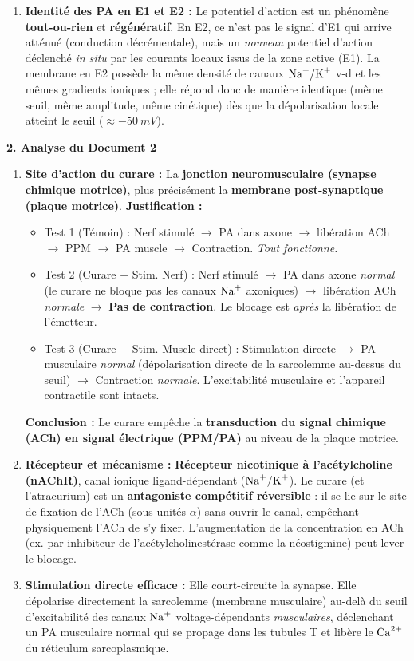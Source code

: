 \documentclass[11pt]{article}
\begin{document}
\begin{exoresolu}
\begin{enumerate}
    \item \textbf{Identité des PA en E1 et E2 :} Le potentiel d'action est un phénomène \textbf{tout-ou-rien} et \textbf{régénératif}. En E2, ce n'est pas le signal d'E1 qui arrive atténué (conduction décrémentale), mais un \emph{nouveau} potentiel d'action déclenché \emph{in situ} par les courants locaux issus de la zone active (E1). La membrane en E2 possède la même densité de canaux $\ce{Na+}/\ce{K+}$ v-d et les mêmes gradients ioniques ; elle répond donc de manière identique (même seuil, même amplitude, même cinétique) dès que la dépolarisation locale atteint le seuil ($\approx \SI{-50}{mV}$).
\end{enumerate}

\textbf{2. Analyse du Document 2}
\begin{enumerate}
    \item \textbf{Site d'action du curare :} La \textbf{jonction neuromusculaire (synapse chimique motrice)}, plus précisément la \textbf{membrane post-synaptique (plaque motrice)}.
    \textbf{Justification :}
    \begin{itemize}
        \item Test 1 (Témoin) : Nerf stimulé $\rightarrow$ PA dans axone $\rightarrow$ libération ACh $\rightarrow$ PPM $\rightarrow$ PA muscle $\rightarrow$ Contraction. \emph{Tout fonctionne.}
        \item Test 2 (Curare + Stim. Nerf) : Nerf stimulé $\rightarrow$ PA dans axone \emph{normal} (le curare ne bloque pas les canaux $\ce{Na+}$ axoniques) $\rightarrow$ libération ACh \emph{normale} $\rightarrow$ \textbf{Pas de contraction}. Le blocage est \emph{après} la libération de l'émetteur.
        \item Test 3 (Curare + Stim. Muscle direct) : Stimulation directe $\rightarrow$ PA musculaire \emph{normal} (dépolarisation directe de la sarcolemme au-dessus du seuil) $\rightarrow$ Contraction \emph{normale}. L'excitabilité musculaire et l'appareil contractile sont intacts.
    \end{itemize}
    \textbf{Conclusion :} Le curare empêche la \textbf{transduction du signal chimique (ACh) en signal électrique (PPM/PA)} au niveau de la plaque motrice.
    \item \textbf{Récepteur et mécanisme :} \textbf{Récepteur nicotinique à l'acétylcholine (nAChR)}, canal ionique ligand-dépendant ($\ce{Na+}/\ce{K+}$). Le curare (et l'atracurium) est un \textbf{antagoniste compétitif réversible} : il se lie sur le site de fixation de l'ACh (sous-unités $\alpha$) sans ouvrir le canal, empêchant physiquement l'ACh de s'y fixer. L'augmentation de la concentration en ACh (ex. par inhibiteur de l'acétylcholinestérase comme la néostigmine) peut lever le blocage.
    \item \textbf{Stimulation directe efficace :} Elle court-circuite la synapse. Elle dépolarise directement la sarcolemme (membrane musculaire) au-delà du seuil d'excitabilité des canaux $\ce{Na+}$ voltage-dépendants \emph{musculaires}, déclenchant un PA musculaire normal qui se propage dans les tubules T et libère le $\ce{Ca^2+}$ du réticulum sarcoplasmique.
\end{enumerate}


\end{exoresolu}
\end{document}
